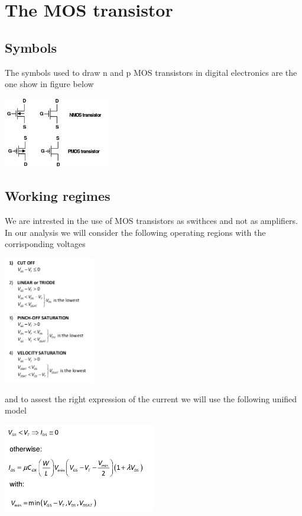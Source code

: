 \chapter{The MOS transistor}
\section{Symbols}
The symbols used to draw n and p MOS transistors in digital electronics are the one show in figure below

\centering
\includegraphics[width=0.35\textwidth]{C2_1.png}\\
\raggedright



\section{Working regimes}
We are intrested in the use of MOS transistors as swithces and not as amplifiers.\\
In our analysis we will consider the following operating regions with the corrisponding voltages 

\centering
\includegraphics[width=0.3\textwidth]{C2_2.png}\\
\raggedright

and to assest the right expression of the current we will use the following unified model 


\centering
\includegraphics[width=0.5\textwidth]{C2_3.png}\\
\raggedright

